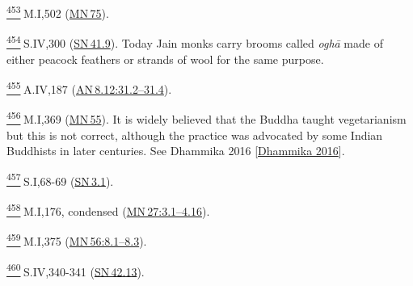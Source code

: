 \label{footprints_split_025.html_fn453}
\hyperref[footprints_split_013.htmlux5cux23fnref453]{\textsuperscript{453}} M.I,502
(\href{https://suttacentral.net/mn75/en/sujato}{MN\,75}).

\label{footprints_split_025.html_fn454}
\hyperref[footprints_split_013.htmlux5cux23fnref454]{\textsuperscript{454}} S.IV,300
(\href{https://suttacentral.net/sn41.9/en/sujato}{SN\,41.9}). Today Jain
monks carry brooms called \emph{oghā} made of either peacock feathers or
strands of wool for the same purpose.

\label{footprints_split_025.html_fn455}
\hyperref[footprints_split_013.htmlux5cux23fnref455]{\textsuperscript{455}} A.IV,187
(\href{https://suttacentral.net/an8.12/en/sujato\#31.2}{AN\,8.12:31.2--31.4}).

\label{footprints_split_025.html_fn456}
\hyperref[footprints_split_013.htmlux5cux23fnref456]{\textsuperscript{456}} M.I,369
(\href{https://suttacentral.net/mn55/en/sujato}{MN\,55}). It is widely
believed that the Buddha taught vegetarianism but this is not correct,
although the practice was advocated by some Indian Buddhists in later
centuries. See {Dhammika 2016
{{[}\hyperref[footprints_split_022.htmlux5cux23Dhammikaux5cux25202016]{Dhammika
2016}{]}}}.

\label{footprints_split_025.html_fn457}
\hyperref[footprints_split_013.htmlux5cux23fnref457]{\textsuperscript{457}} S.I,68-69
(\href{https://suttacentral.net/sn3.1/en/sujato}{SN\,3.1}).

\label{footprints_split_025.html_fn458}
\hyperref[footprints_split_013.htmlux5cux23fnref458]{\textsuperscript{458}} M.I,176,
condensed
(\href{https://suttacentral.net/mn27/en/sujato\#3.1}{MN\,27:3.1--4.16}).

\label{footprints_split_025.html_fn459}
\hyperref[footprints_split_013.htmlux5cux23fnref459]{\textsuperscript{459}} M.I,375
(\href{https://suttacentral.net/mn56/en/sujato\#8.1}{MN\,56:8.1--8.3}).

\label{footprints_split_025.html_fn460}
\hyperref[footprints_split_013.htmlux5cux23fnref460]{\textsuperscript{460}} S.IV,340-341
(\href{https://suttacentral.net/sn42.13/en/sujato}{SN\,42.13}).

